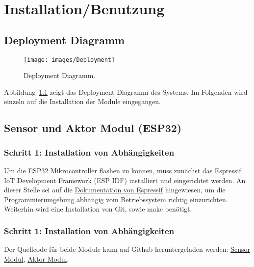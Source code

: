 \chapter{Installation/Benutzung}
\label{cha:Installation/Benutzung}

\section{Deployment Diagramm}

\begin{figure}[hbt]
	\centering
	\texttt{[image: images/Deployment]}
	\caption[Deployment Diagramm]{Deployment Diagramm.}
	\label{fig:deployment_diagramm}
\end{figure}

Abbildung~\ref{fig:deployment_diagramm} zeigt das Deployment Diagramm des Systems. Im Folgenden wird einzeln auf die Installation der Module eingegangen.

\section{Sensor und Aktor Modul (ESP32)}
\label{cha:Installation_IDF}
\subsection{Schritt 1: Installation von Abhängigkeiten}
Um die ESP32 Mikrocontroller flashen zu können, muss zunächst das Espressif IoT Development Framework (ESP IDF) installiert und eingerichtet werden. An dieser Stelle sei auf die \href{https://docs.espressif.com/projects/esp-idf/en/latest/index.html}{Dokumentation von Espressif} hingewiesen, um die Programmierumgebung abhängig vom Betriebssystem richtig einzurichten. Weiterhin wird eine Installation von Git, sowie make benötigt.

\subsection{Schritt 1: Installation von Abhängigkeiten}
Der Quellcode für beide Module kann auf Github heruntergeladen werden: \href{https://github.com/maxbachmann-university/esp32-sensor-modul}{Sensor Modul}, \href{https://github.com/maxbachmann-university/esp32-actuator-module}{Aktor Modul}.


